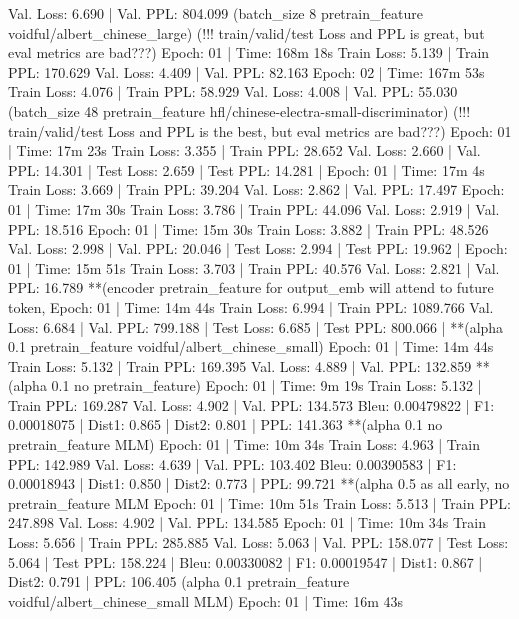 \documentclass[letterpaper]{article} %
\begin{document}
\begin{CJK*}{UTF8}{gbsn}
	 Val. Loss: 6.690 |  Val. PPL: 804.099
(batch_size 8 pretrain_feature voidful/albert_chinese_large)
(!!! train/valid/test Loss and PPL is great, but eval metrics are bad???)
Epoch: 01 | Time: 168m 18s
	Train Loss: 5.139 | Train PPL: 170.629
	 Val. Loss: 4.409 |  Val. PPL:  82.163
Epoch: 02 | Time: 167m 53s
	Train Loss: 4.076 | Train PPL:  58.929
	 Val. Loss: 4.008 |  Val. PPL:  55.030
(batch_size 48 pretrain_feature hfl/chinese-electra-small-discriminator)
(!!! train/valid/test Loss and PPL is the best, but eval metrics are bad???)
Epoch: 01 | Time: 17m 23s
	Train Loss: 3.355 | Train PPL:  28.652
	 Val. Loss: 2.660 |  Val. PPL:  14.301
| Test Loss: 2.659 | Test PPL:  14.281 |
Epoch: 01 | Time: 17m 4s %
	Train Loss: 3.669 | Train PPL:  39.204
	 Val. Loss: 2.862 |  Val. PPL:  17.497
Epoch: 01 | Time: 17m 30s %
	Train Loss: 3.786 | Train PPL:  44.096
	 Val. Loss: 2.919 |  Val. PPL:  18.516
Epoch: 01 | Time: 15m 30s %
	Train Loss: 3.882 | Train PPL:  48.526
	 Val. Loss: 2.998 |  Val. PPL:  20.046
| Test Loss: 2.994 | Test PPL:  19.962 |
Epoch: 01 | Time: 15m 51s %
	Train Loss: 3.703 | Train PPL:  40.576
	 Val. Loss: 2.821 |  Val. PPL:  16.789
**(encoder pretrain_feature for output_emb will attend to future token, %
Epoch: 01 | Time: 14m 44s
	Train Loss: 6.994 | Train PPL: 1089.766
	 Val. Loss: 6.684 |  Val. PPL: 799.188
| Test Loss: 6.685 | Test PPL: 800.066 |
**(alpha 0.1 pretrain_feature voidful/albert_chinese_small)
Epoch: 01 | Time: 14m 44s
	Train Loss: 5.132 | Train PPL: 169.395
	 Val. Loss: 4.889 |  Val. PPL: 132.859
**(alpha 0.1 no pretrain_feature)
Epoch: 01 | Time: 9m 19s
	Train Loss: 5.132 | Train PPL: 169.287
	 Val. Loss: 4.902 |  Val. PPL: 134.573
Bleu: 0.00479822 | F1: 0.00018075 | Dist1: 0.865 | Dist2: 0.801 | PPL: 141.363
**(alpha 0.1 no pretrain_feature MLM)
Epoch: 01 | Time: 10m 34s
	Train Loss: 4.963 | Train PPL: 142.989
	 Val. Loss: 4.639 |  Val. PPL: 103.402
Bleu: 0.00390583 | F1: 0.00018943 | Dist1: 0.850 | Dist2: 0.773 | PPL:  99.721
**(alpha 0.5 as all early, no pretrain_feature MLM %
Epoch: 01 | Time: 10m 51s
	Train Loss: 5.513 | Train PPL: 247.898
	 Val. Loss: 4.902 |  Val. PPL: 134.585
Epoch: 01 | Time: 10m 34s
	Train Loss: 5.656 | Train PPL: 285.885
	 Val. Loss: 5.063 |  Val. PPL: 158.077
| Test Loss: 5.064 | Test PPL: 158.224 |
Bleu: 0.00330082 | F1: 0.00019547 | Dist1: 0.867 | Dist2: 0.791 | PPL: 106.405
(alpha 0.1 pretrain_feature voidful/albert_chinese_small MLM)
Epoch: 01 | Time: 16m 43s

\end{CJK*}
\end{document}
